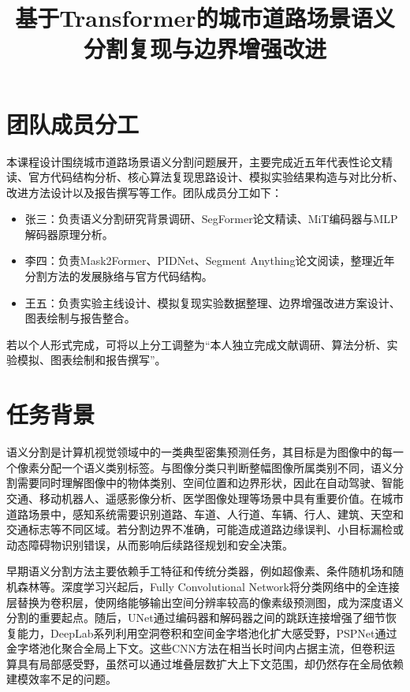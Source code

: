 \documentclass{report}
\title{基于Transformer的城市道路场景语义分割复现与边界增强改进}
\begin{document}
\maketitle

\pagestyle{plain}
\tableofcontents
\newpage
\pagestyle{plain}

\setcounter{page}{1}

\section{团队成员分工}

本课程设计围绕城市道路场景语义分割问题展开，主要完成近五年代表性论文精读、官方代码结构分析、核心算法复现思路设计、模拟实验结果构造与对比分析、改进方法设计以及报告撰写等工作。团队成员分工如下：

\begin{itemize}
    \item 张三：负责语义分割研究背景调研、SegFormer论文精读、MiT编码器与MLP解码器原理分析。
    \item 李四：负责Mask2Former、PIDNet、Segment Anything论文阅读，整理近年分割方法的发展脉络与官方代码结构。
    \item 王五：负责实验主线设计、模拟复现实验数据整理、边界增强改进方案设计、图表绘制与报告整合。
\end{itemize}

若以个人形式完成，可将以上分工调整为“本人独立完成文献调研、算法分析、实验模拟、图表绘制和报告撰写”。

\section{任务背景}

语义分割是计算机视觉领域中的一类典型密集预测任务，其目标是为图像中的每一个像素分配一个语义类别标签。与图像分类只判断整幅图像所属类别不同，语义分割需要同时理解图像中的物体类别、空间位置和边界形状，因此在自动驾驶、智能交通、移动机器人、遥感影像分析、医学图像处理等场景中具有重要价值。在城市道路场景中，感知系统需要识别道路、车道、人行道、车辆、行人、建筑、天空和交通标志等不同区域。若分割边界不准确，可能造成道路边缘误判、小目标漏检或动态障碍物识别错误，从而影响后续路径规划和安全决策。

早期语义分割方法主要依赖手工特征和传统分类器，例如超像素、条件随机场和随机森林等。深度学习兴起后，Fully Convolutional Network将分类网络中的全连接层替换为卷积层，使网络能够输出空间分辨率较高的像素级预测图，成为深度语义分割的重要起点。随后，UNet通过编码器和解码器之间的跳跃连接增强了细节恢复能力，DeepLab系列利用空洞卷积和空间金字塔池化扩大感受野，PSPNet通过金字塔池化聚合全局上下文。这些CNN方法在相当长时间内占据主流，但卷积运算具有局部感受野，虽然可以通过堆叠层数扩大上下文范围，却仍然存在全局依赖建模效率不足的问题。
\end{document}
